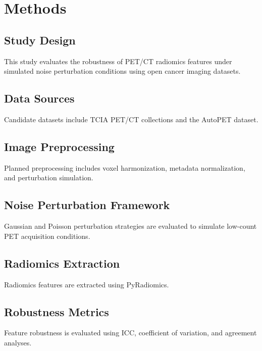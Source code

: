 
\section{Methods}

\subsection{Study Design}

This study evaluates the robustness of PET/CT radiomics features under simulated noise perturbation conditions using open cancer imaging datasets.

\subsection{Data Sources}

Candidate datasets include TCIA PET/CT collections and the AutoPET dataset.

\subsection{Image Preprocessing}

Planned preprocessing includes voxel harmonization, metadata normalization, and perturbation simulation.

\subsection{Noise Perturbation Framework}

Gaussian and Poisson perturbation strategies are evaluated to simulate low-count PET acquisition conditions.

\subsection{Radiomics Extraction}

Radiomics features are extracted using PyRadiomics.

\subsection{Robustness Metrics}

Feature robustness is evaluated using ICC, coefficient of variation, and agreement analyses.
